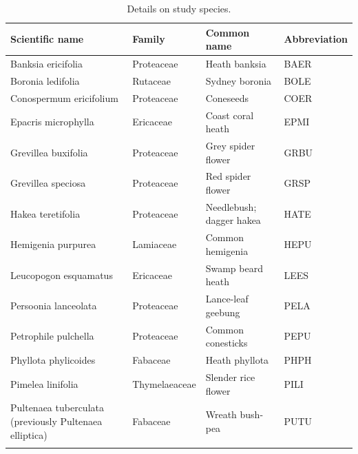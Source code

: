 \documentclass[10pt,twoside]{article}\usepackage[]{graphicx}\usepackage[]{color}
\begin{document}
\begingroup\small
\begin{longtable}{p{5cm}p{3cm}p{5cm}p{2cm}}
\caption{Details on study species.} \\ 
  \hline
Scientific name & Family & Common name & Abbreviation \\ 
  \hline
Banksia ericifolia & Proteaceae & Heath banksia & BAER \\ 
  Boronia ledifolia & Rutaceae & Sydney boronia & BOLE \\ 
  Conospermum ericifolium & Proteaceae & Coneseeds & COER \\ 
  Epacris microphylla & Ericaceae & Coast coral heath & EPMI \\ 
  Grevillea buxifolia & Proteaceae & Grey spider flower & GRBU \\ 
  Grevillea speciosa & Proteaceae & Red spider flower & GRSP \\ 
  Hakea teretifolia & Proteaceae & Needlebush; dagger hakea & HATE \\ 
  Hemigenia purpurea  & Lamiaceae & Common hemigenia & HEPU \\ 
  Leucopogon esquamatus & Ericaceae & Swamp beard heath & LEES \\ 
  Persoonia lanceolata & Proteaceae & Lance-leaf geebung & PELA \\ 
  Petrophile pulchella & Proteaceae & Common conesticks & PEPU \\ 
  Phyllota phylicoides & Fabaceae & Heath phyllota & PHPH \\ 
  Pimelea linifolia & Thymelaeaceae & Slender rice flower & PILI \\ 
  Pultenaea tuberculata (previously Pultenaea elliptica) & Fabaceae & Wreath bush-pea & PUTU \\ 
   \hline
\hline
\label{tab:species}
\end{longtable}
\endgroup
\begingroup\small
\end{document}
